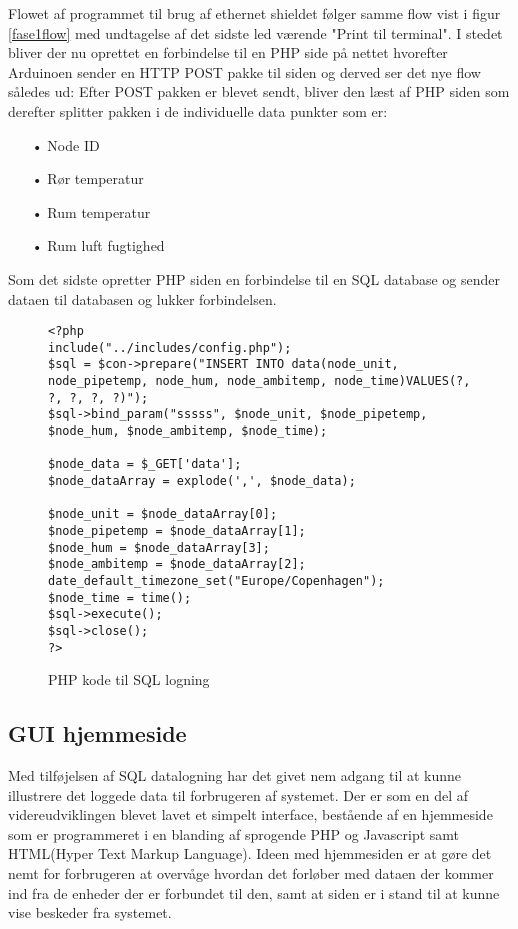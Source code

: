 Flowet af programmet til brug af ethernet shieldet følger samme flow vist i figur \ref{fase1flow}
med undtagelse af det sidste led værende "Print til terminal". I stedet bliver der nu oprettet en forbindelse til en PHP side på nettet hvorefter Arduinoen sender en HTTP POST pakke til siden og derved ser det nye flow således ud:
\newline
Efter POST pakken er blevet sendt, bliver den læst af PHP siden som derefter splitter pakken i de individuelle data punkter som er:
\begin{enumerate}
	\item[•]Node ID
	\item[•]Rør temperatur
	\item[•]Rum temperatur
	\item[•]Rum luft fugtighed
\end{enumerate}
Som det sidste opretter PHP siden en forbindelse til en SQL database og sender dataen til databasen og lukker forbindelsen.
\begin{figure}[!ht]
	\begin{lstlisting}
<?php
include("../includes/config.php");
$sql = $con->prepare("INSERT INTO data(node_unit, node_pipetemp, node_hum, node_ambitemp, node_time)VALUES(?, ?, ?, ?, ?)");
$sql->bind_param("sssss", $node_unit, $node_pipetemp, $node_hum, $node_ambitemp, $node_time);

$node_data = $_GET['data'];
$node_dataArray = explode(',', $node_data);

$node_unit = $node_dataArray[0];
$node_pipetemp = $node_dataArray[1];
$node_hum = $node_dataArray[3];
$node_ambitemp = $node_dataArray[2];
date_default_timezone_set("Europe/Copenhagen"); 
$node_time = time(); 
$sql->execute();
$sql->close();
?>
\end{lstlisting}
\caption{PHP kode til SQL logning}
\label{phpsql}
\end{figure}

\subsection{GUI hjemmeside}
Med tilføjelsen af SQL datalogning har det givet nem adgang til at kunne illustrere det loggede data til forbrugeren af systemet.
Der er som en del af videreudviklingen blevet lavet et simpelt interface, bestående af en hjemmeside som er programmeret i en blanding af sprogende PHP og Javascript samt HTML(Hyper Text Markup Language).
\newline
Ideen med hjemmesiden er at gøre det nemt for forbrugeren at overvåge hvordan det forløber med dataen der kommer ind fra de enheder der er forbundet til den, samt at siden er i stand til at kunne vise beskeder fra systemet.

